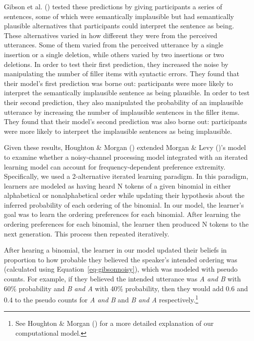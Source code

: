 \documentclass[
  12pt,
]{scrartcl}
\begin{document}
Gibson et al.
()
tested these predictions by giving participants a series of sentences,
some of which were semantically implausible but had semantically
plausible alternatives that participants could interpret the sentence as
being. These alternatives varied in how different they were from the
perceived utterances. Some of them varied from the perceived utterance
by a single insertion or a single deletion, while others varied by two
insertions or two deletions. In order to test their first prediction,
they increased the noise by manipulating the number of filler items with
syntactic errors. They found that their model's first prediction was
borne out: participants were more likely to interpret the semantically
implausible sentence as being plausible. In order to test their second
prediction, they also manipulated the probability of an implausible
utterance by increasing the number of implausible sentences in the
filler items. They found that their model's second prediction was also
borne out: participants were more likely to interpret the implausible
sentences as being implausible.

Given these results, Houghton \& Morgan
()
extended Morgan \& Levy
()'s
model to examine whether a noisy-channel processing model integrated
with an iterated learning model can account for frequency-dependent
preference extremity. Specifically, we used a 2-alternative iterated
learning paradigm. In this paradigm, learners are modeled as having
heard N tokens of a given binomial in either alphabetical or
nonalphabetical order while updating their hypothesis about the inferred
probability of each ordering of the binomial. In our model, the
learner's goal was to learn the ordering preferences for each binomial.
After learning the ordering preferences for each binomial, the learner
then produced N tokens to the next generation. This process then
repeated iteratively.

After hearing a binomial, the learner in our model updated their beliefs
in proportion to how probable they believed the speaker's intended
ordering was (calculated using Equation~\ref{eq-gibsonnoisy}), which was
modeled with pseudo counts. For example, if they believed the intended
utterance was \emph{A and B} with 60\% probability and \emph{B and A}
with 40\% probability, then they would add 0.6 and 0.4 to the pseudo
counts for \emph{A and B} and \emph{B and A} respectively.\footnote{See
  Houghton \& Morgan
  ()
  for a more detailed explanation of our computational model.}
\end{document}
